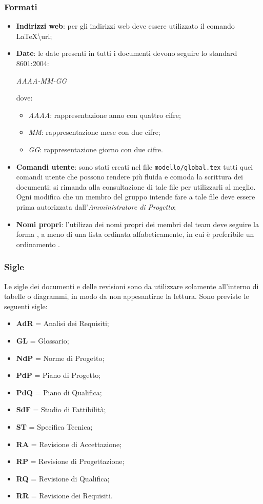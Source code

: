 \subsubsection{Formati}
\begin{itemize}
\item \textbf{Indirizzi web}: per gli indirizzi web deve essere utilizzato il comando \LaTeX \textbackslash{url};
\item \textbf{Date}: le date presenti in tutti i documenti devono seguire lo standard  8601:2004: 
\begin{center}
\textit{AAAA-MM-GG}
\end{center}
dove:
\begin{itemize}
\item \textit{AAAA}: rappresentazione anno con quattro cifre;
\item \textit{MM}: rappresentazione mese con due cifre;
\item \textit{GG}: rappresentazione giorno con due cifre.
\end{itemize}
\item \textbf{Comandi utente}: sono stati creati nel file \texttt{modello/global.tex} tutti quei comandi utente che possono rendere più fluida e comoda la scrittura dei documenti; si rimanda alla consultazione di tale file per utilizzarli al meglio. Ogni modifica che un membro del gruppo intende fare a tale file deve essere prima autorizzata dall'\textit{Amministratore di Progetto};
\item \textbf{Nomi propri}: l'utilizzo dei nomi propri dei membri del team deve seguire la forma , a meno di una lista ordinata alfabeticamente, in cui è preferibile un ordinamento .
\end{itemize}

\subsubsection{Sigle}

Le sigle dei documenti e delle revisioni sono da utilizzare solamente all'interno di tabelle o diagrammi, in modo da non appesantirne la lettura. Sono previste le seguenti sigle:

\begin{itemize}
\item \textbf{AdR} = Analisi dei Requisiti;
\item \textbf{GL} = Glossario;
\item \textbf{NdP} = Norme di Progetto;
\item \textbf{PdP} = Piano di Progetto;
\item \textbf{PdQ} = Piano di Qualifica;
\item \textbf{SdF} = Studio di Fattibilità;
\item \textbf{ST} = Specifica Tecnica;
\item \textbf{RA} = Revisione di Accettazione;
\item \textbf{RP} = Revisione di Progettazione;
\item \textbf{RQ} = Revisione di Qualifica;
\item \textbf{RR} = Revisione dei Requisiti.
\end{itemize}

